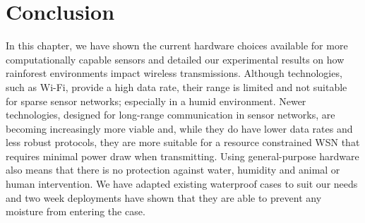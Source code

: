 \section{Conclusion}
	In this chapter, we have shown the current hardware choices available for more computationally capable sensors and detailed our experimental results on how rainforest environments impact wireless transmissions. Although technologies, such as Wi-Fi, provide a high data rate, their range is limited and not suitable for sparse sensor networks; especially in a humid environment.
	Newer technologies, designed for long-range communication in sensor networks, are becoming increasingly more viable and, while they do have lower data rates and less robust protocols, they are more suitable for a resource constrained WSN that requires minimal power draw when transmitting. 
	Using general-purpose hardware also means that there is no protection against water, humidity and animal or human intervention. We have adapted existing waterproof cases to suit our needs and two week deployments have shown that they are able to prevent any moisture from entering the case.
	 